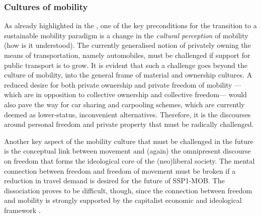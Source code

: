 \subsubsection*{Cultures of mobility}
As already highlighted in the , one of the key preconditions for the transition to a sustainable mobility paradigm is a change in the \emph{cultural perception} of mobility (how is it understood). The currently generalised notion of privately owning the means of transportation, namely automobiles, must be challenged if support for public transport is to grow. It is evident that such a challenge goes beyond the culture of mobility, into the general frame of material and ownership cultures. A reduced desire for both private ownership and private freedom of mobility ---which are in opposition to collective ownership and collective freedom--- would also pave the way for car sharing and carpooling schemes, which are currently deemed as lower-status, inconvenient alternatives. Therefore, it is the discourses around personal freedom and private property that must be radically challenged.

Another key aspect of the mobility culture that must be challenged in the future is the conceptual link between movement and (again) the omnipresent discourse on freedom that forms the ideological core of the (neo)liberal society. The mental connection between freedom and freedom of movement must be broken if a reduction in travel demand is desired for the future of SSP1-MOB. The dissociation proves to be difficult, though, since the connection between freedom and mobility is strongly supported by the capitalist economic and ideological framework \parencite{freudendal-pedersen2009_MobilityDailyLife,sheller2012_EmergenceNewCultures}.

